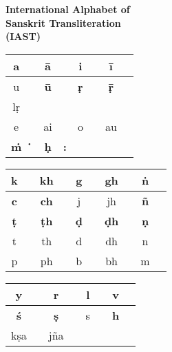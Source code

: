 \thispagestyle{empty}
\begin{center}
{\Large\bfseries International Alphabet of\\[3pt] Sanskrit Transliteration\\[8pt] (IAST)}

\vspace{.3cm}

\bgroup
\fontsize{10}{12pt}\selectfont
\renewcommand{\arraystretch}{1.45}
\begin{tabular}{|c|c!{\vrule width 0.8pt}c|c!{\vrule width 0.8pt}c|c!{\vrule width 0.8pt}c|c|}
\hline
a &  & {\bf ā} &  & i &  & {\bf ī} & \\
\hline
u &      & {\bf ū} &  & {\bf ṛ} &  & {\bf ṝ} &  \\
\hline
lṛ &    &     &                       &     &                       &      & \\
\hline
e &  & ai &  & o &  & au & \\
\hline
{\bf ṁ} &  {\bf‍\.{\phantom{i}}}  & {\bf ḥ}  & {\bf :}         &   &            &   & \\  	
\hline
\end{tabular}
\vskip 10pt

\begin{tabular}{|c|c!{\vrule width 0.8pt}c|c!{\vrule width 0.8pt}c|c!{\vrule width 0.8pt}c|c!{\vrule width 0.8pt}c|c|}
\hline
k &  & kh &  & g &  & gh &  & {\bf ṅ} & \\
\hline
{\bf c} &  & {\bf ch} &  & j &  & jh &   & {\bf ñ} &  \\
\hline
{\bf ṭ} &  & {\bf ṭh} &  & {\bf ḍ} &   & {\bf ḍh} &  & {\bf ṇ} &   \\
\hline
t &   & th &   & d &  & dh &   & n &  \\
\hline
p &  & ph &  & b &  & bh &   & m &  \\ 
\hline
\end{tabular}
\vskip 10pt

\begin{tabular}{|c|c!{\vrule width 0.8pt}c|c!{\vrule width 0.8pt}c|c!{\vrule width 0.8pt}c|c|}
\hline
y &      & r   &  & l &  & v &  \\
\hline
{\bf ś} &    & {\bf ṣ}   &  & s &  & {\bf h} &  \\
\hline
kṣa &  & jña &  &    &    &   &  \\
\hline
\end{tabular}


\end{center}
